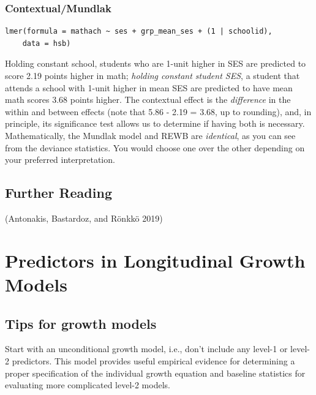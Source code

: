 \documentclass[
  letterpaper,
  DIV=11,
  numbers=noendperiod]{scrreprt}
\begin{document}
\hypertarget{contextualmundlak}{%
\subsection{Contextual/Mundlak}\label{contextualmundlak}}

\begin{verbatim}
lmer(formula = mathach ~ ses + grp_mean_ses + (1 | schoolid), 
    data = hsb)
\end{verbatim}

Holding constant school, students who are 1-unit higher in SES are
predicted to score 2.19 points higher in math; \emph{holding constant
student SES}, a student that attends a school with 1-unit higher in mean
SES are predicted to have mean math scores 3.68 points higher. The
contextual effect is the \emph{difference} in the within and between
effects (note that 5.86 - 2.19 = 3.68, up to rounding), and, in
principle, its significance test allows us to determine if having both
is necessary. Mathematically, the Mundlak model and REWB are
\emph{identical}, as you can see from the deviance statistics. You would
choose one over the other depending on your preferred interpretation.

\hypertarget{further-reading-2}{%
\section{Further Reading}\label{further-reading-2}}

(Antonakis, Bastardoz, and Rönkkö 2019)

\hypertarget{predictors-in-longitudinal-growth-models}{%
\chapter{Predictors in Longitudinal Growth
Models}\label{predictors-in-longitudinal-growth-models}}

\hypertarget{tips-for-growth-models}{%
\section{Tips for growth models}\label{tips-for-growth-models}}

Start with an unconditional growth model, i.e., don't include any
level-1 or level-2 predictors. This model provides useful empirical
evidence for determining a proper specification of the individual growth
equation and baseline statistics for evaluating more complicated level-2
models.
\end{document}
